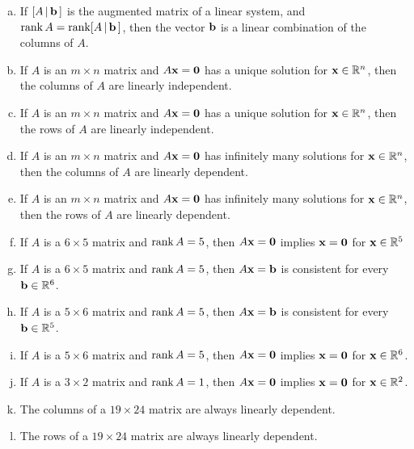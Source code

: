 \begin{prob}
\begin{enumerate}[a)]
%
\medskip
\item If $[A\,|\,\mathbf{b}\,]$ is the augmented matrix of a linear system, and $\operatorname{rank} A=\operatorname{rank}  [A\,|\,\mathbf{b}\,]$, then the vector $\mathbf{b}$ is a linear combination of the columns of $A$. 
\medskip
%
\item\sov  If $A$ is an $m \times n$ matrix and $A\mathbf{x}=\mathbf{0}$ has a unique solution for $\mathbf{x}\in \mathbb{R}^n$, then the columns of $A$ are linearly independent.
%
\item If $A$ is an $m \times n$ matrix and $A\mathbf{x}=\mathbf{0}$ has a unique solution for $\mathbf{x}\in \mathbb{R}^n$, then the rows of $A$ are linearly independent.
%
\item\sov  If $A$ is an $m \times n$ matrix and $A\mathbf{x}=\mathbf{0}$ has infinitely many solutions for $\mathbf{x}\in \mathbb{R}^n$, then the columns of $A$ are linearly dependent.
%
\medskip
\item If $A$ is an $m \times n$ matrix and $A\mathbf{x}=\mathbf{0}$ has infinitely many solutions for $\mathbf{x}\in \mathbb{R}^n$, then the rows of $A$ are linearly dependent.
%
\medskip
\item\sov  If $A$ is a $6 \times 5$ matrix and $\operatorname{rank} A=5$, then $A\mathbf{x}=\mathbf{0}$ implies $\mathbf{x}=\mathbf{0}$ for $\mathbf{x}\in \mathbb{R}^5$
\medskip
%
\item If $A$ is a $6 \times 5$ matrix and $\operatorname{rank} A=5$, then $A\mathbf{x}=\mathbf{b}$ is consistent for every $\mathbf{b} \in \mathbb{R}^6$.
\medskip
%
\item\sov  If $A$ is a $5 \times 6$ matrix and $\operatorname{rank} A=5$, then $A\mathbf{x}=\mathbf{b}$ is consistent for every $\mathbf{b} \in \mathbb{R}^5$.
\medskip
%
\item If $A$ is a $5 \times 6$ matrix and $\operatorname{rank} A=5$, then $A\mathbf{x}=\mathbf{0}$ implies $\mathbf{x}=\mathbf{0}$ for $\mathbf{x}\in \mathbb{R}^6$.
\medskip
%
\item\sov  If $A$ is a $3 \times 2$ matrix and $\operatorname{rank} A=1$, then $A\mathbf{x}=\mathbf{0}$ implies $\mathbf{x}=\mathbf{0}$ for $\mathbf{x}\in \mathbb{R}^2$.
\medskip
%
\item The columns of a $19\times 24$ matrix are
always linearly dependent.
\medskip
%
\item\sov  The rows of a $19 \times 24$ matrix are
always linearly dependent.
\medskip
%
\end{enumerate}



\end{prob}

